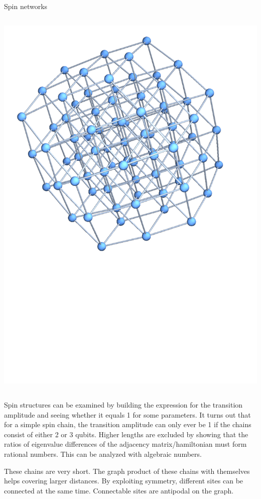 {\begin{frame}[t]{Spin networks}
\begin{columns}[T]
\begin{column}{0.33\textwidth}
     		\includegraphics[trim=30mm 0 0 0, width=\textwidth]{Images/chain3_hypercube}
		\end{column}
	\end{columns}
\end{frame}}

\begin{center}
\end{center}

\noindent Spin structures can be examined by building the expression for the transition amplitude and seeing whether it equals 1 for some parameters. It turns out that for a simple spin chain, the transition amplitude can only ever be 1 if the chains consist of either 2 or 3 qubits. Higher lengths are excluded by showing that the ratios of eigenvalue differences of the adjacency matrix/hamiltonian must form rational numbers. This can be analyzed with algebraic numbers.\par
These chains are very short. The graph product of these chains with themselves helps covering larger distances. By exploiting symmetry, different sites can be connected at the same time. Connectable sites are antipodal on the graph.

